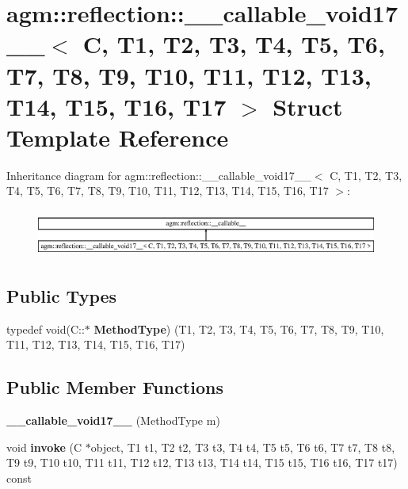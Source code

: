 \hypertarget{structagm_1_1reflection_1_1____callable__void17____}{}\section{agm\+:\+:reflection\+:\+:\+\_\+\+\_\+callable\+\_\+void17\+\_\+\+\_\+$<$ C, T1, T2, T3, T4, T5, T6, T7, T8, T9, T10, T11, T12, T13, T14, T15, T16, T17 $>$ Struct Template Reference}
\label{structagm_1_1reflection_1_1____callable__void17____}
Inheritance diagram for agm\+:\+:reflection\+:\+:\+\_\+\+\_\+callable\+\_\+void17\+\_\+\+\_\+$<$ C, T1, T2, T3, T4, T5, T6, T7, T8, T9, T10, T11, T12, T13, T14, T15, T16, T17 $>$\+:\begin{figure}[H]
\begin{center}
\leavevmode
\includegraphics[height=1.588652cm]{structagm_1_1reflection_1_1____callable__void17____}
\end{center}
\end{figure}
\subsection*{Public Types}
\begin{DoxyCompactItemize}
\item 
typedef void(C\+::$\ast$ {\bfseries Method\+Type}) (T1, T2, T3, T4, T5, T6, T7, T8, T9, T10, T11, T12, T13, T14, T15, T16, T17)\hypertarget{structagm_1_1reflection_1_1____callable__void17_____a7ba0d6b60c5f1796b950e8ea3190174e}{}\label{structagm_1_1reflection_1_1____callable__void17_____a7ba0d6b60c5f1796b950e8ea3190174e}

\end{DoxyCompactItemize}
\subsection*{Public Member Functions}
\begin{DoxyCompactItemize}
\item 
{\bfseries \+\_\+\+\_\+callable\+\_\+void17\+\_\+\+\_\+} (Method\+Type m)\hypertarget{structagm_1_1reflection_1_1____callable__void17_____a1bd58d689d9254b158c22be75d7fffbe}{}\label{structagm_1_1reflection_1_1____callable__void17_____a1bd58d689d9254b158c22be75d7fffbe}

\item 
void {\bfseries invoke} (C $\ast$object, T1 t1, T2 t2, T3 t3, T4 t4, T5 t5, T6 t6, T7 t7, T8 t8, T9 t9, T10 t10, T11 t11, T12 t12, T13 t13, T14 t14, T15 t15, T16 t16, T17 t17) const \hypertarget{structagm_1_1reflection_1_1____callable__void17_____a3f9b5633f45aff87107662307ee94913}{}\label{structagm_1_1reflection_1_1____callable__void17_____a3f9b5633f45aff87107662307ee94913}

\end{DoxyCompactItemize}
